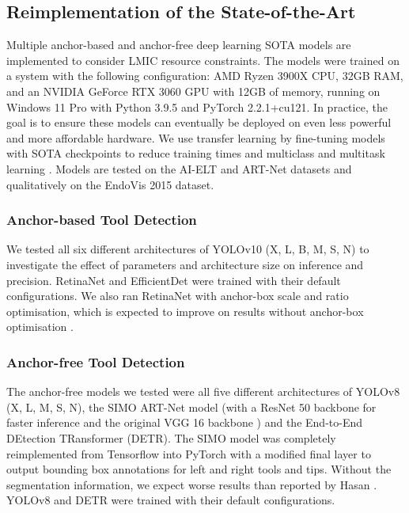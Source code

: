 \subsection{Reimplementation of the State-of-the-Art}

Multiple anchor-based and anchor-free deep learning SOTA models are implemented to consider LMIC resource constraints. The models were trained on a system with the following configuration: AMD Ryzen 3900X CPU, 32GB RAM, and an NVIDIA GeForce RTX 3060 GPU with 12GB of memory, running on Windows 11 Pro with Python 3.9.5 and PyTorch 2.2.1+cu121. In practice, the goal is to ensure these models can eventually be deployed on even less powerful and more affordable hardware. We use transfer learning by fine-tuning models with SOTA checkpoints to reduce training times and multiclass and multitask learning \cite{alabi_multitask_2024}. Models are tested on the AI-ELT and ART-Net datasets and qualitatively on the EndoVis 2015 dataset.

\subsubsection{Anchor-based Tool Detection}

We tested all six different architectures of YOLOv10 (X, L, B, M, S, N) to investigate the effect of parameters and architecture size on inference and precision. RetinaNet and EfficientDet were trained with their default configurations. We also ran RetinaNet with anchor-box scale and ratio optimisation, which is expected to improve on results without anchor-box optimisation \cite{zlocha_improving_2019}.

\subsubsection{Anchor-free Tool Detection}

The anchor-free models we tested were all five different architectures of YOLOv8 (X, L, M, S, N), the SIMO ART-Net model (with a ResNet 50 backbone for faster inference \cite{koonce_resnet_2021} and the original VGG 16 backbone \cite{hasan_detection_2021}) and the End-to-End DEtection TRansformer (DETR). The SIMO model was completely reimplemented from Tensorflow into PyTorch with a modified final layer to output bounding box annotations for left and right tools and tips. Without the segmentation information, we expect worse results than reported by Hasan \cite{hasan_detection_2021}. YOLOv8 and DETR were trained with their default configurations.

